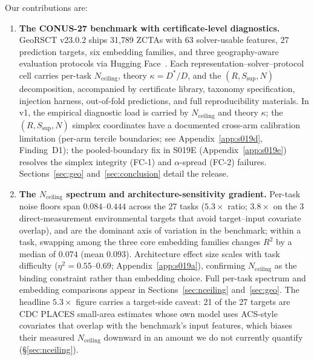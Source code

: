 \documentclass{article}
\begin{document}
Our contributions are:
\begin{enumerate}
\item \textbf{The CONUS-27 benchmark with certificate-level diagnostics.} GeoRSCT v23.0.2 ships 31{,}789 ZCTAs with 63 solver-usable features, 27 prediction targets, six embedding families, and three geography-aware evaluation protocols via Hugging Face~\citep{geocert2026}. Each representation--solver--protocol cell carries per-task $N_{\text{ceiling}}$, theory $\kappa = D^*/D$, and the $(R, S_{\text{sup}}, N)$ decomposition, accompanied by certificate library, taxonomy specification, injection harness, out-of-fold predictions, and full reproducibility materials. In v1, the empirical diagnostic load is carried by $N_{\text{ceiling}}$ and theory $\kappa$; the $(R, S_{\text{sup}}, N)$ simplex coordinates have a documented cross-arm calibration limitation (per-arm tercile boundaries; see Appendix~\ref{app:s019d}, Finding~D1); the pooled-boundary fix in S019E (Appendix~\ref{app:s019e}) resolves the simplex integrity (FC-1) and $\alpha$-spread (FC-2) failures. Sections~\ref{sec:geo} and~\ref{sec:conclusion} detail the release.

\item \textbf{The $N_{\text{ceiling}}$ spectrum and architecture-sensitivity gradient.} Per-task noise floors span $0.084$--$0.444$ across the 27 tasks ($5.3{\times}$ ratio; $3.8{\times}$ on the 3 direct-measurement environmental targets that avoid target--input covariate overlap), and are the dominant axis of variation in the benchmark; within a task, swapping among the three core embedding families changes $R^2$ by a median of $0.074$ (mean $0.093$). Architecture effect size scales with task difficulty ($\eta^2 = 0.55$--$0.69$; Appendix~\ref{app:s019a}), confirming $N_{\text{ceiling}}$ as the binding constraint rather than embedding choice. Full per-task spectrum and embedding comparisons appear in Sections~\ref{sec:nceiling} and~\ref{sec:geo}. The headline $5.3{\times}$ figure carries a target-side caveat: 21 of the 27 targets are CDC PLACES small-area estimates whose own model uses ACS-style covariates that overlap with the benchmark's input features, which biases their measured $N_{\text{ceiling}}$ downward in an amount we do not currently quantify (\S\ref{sec:nceiling}).


\end{enumerate}
\end{document}

